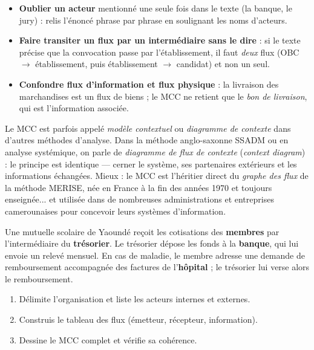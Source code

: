 \documentclass[11pt]{article}
\begin{document}
\begin{attention}
\begin{itemize}
\item \textbf{Oublier un acteur} mentionné une seule fois dans le texte (la banque, le jury) : relis l'énoncé phrase par phrase en soulignant les noms d'acteurs.
\item \textbf{Faire transiter un flux par un intermédiaire sans le dire} : si le texte précise que la convocation passe par l'établissement, il faut \emph{deux} flux (OBC $\rightarrow$ établissement, puis établissement $\rightarrow$ candidat) et non un seul.
\item \textbf{Confondre flux d'information et flux physique} : la livraison des marchandises est un flux de biens ; le MCC ne retient que le \emph{bon de livraison}, qui est l'information associée.
\end{itemize}
\end{attention}

\begin{savaistu}
Le MCC est parfois appelé \emph{modèle contextuel} ou \emph{diagramme de contexte} dans d'autres méthodes d'analyse. Dans la méthode anglo-saxonne SSADM ou en analyse systémique, on parle de \emph{diagramme de flux de contexte} (\emph{context diagram}) : le principe est identique — cerner le système, ses partenaires extérieurs et les informations échangées. Mieux : le MCC est l'héritier direct du \emph{graphe des flux} de la méthode MERISE, née en France à la fin des années 1970 et toujours enseignée... et utilisée dans de nombreuses administrations et entreprises camerounaises pour concevoir leurs systèmes d'information.
\end{savaistu}

\begin{exercice}
Une mutuelle scolaire de Yaoundé reçoit les cotisations des \textbf{membres} par l'intermédiaire du \textbf{trésorier}. Le trésorier dépose les fonds à la \textbf{banque}, qui lui envoie un relevé mensuel. En cas de maladie, le membre adresse une demande de remboursement accompagnée des factures de l'\textbf{hôpital} ; le trésorier lui verse alors le remboursement.
\begin{enumerate}
\item Délimite l'organisation et liste les acteurs internes et externes.
\item Construis le tableau des flux (émetteur, récepteur, information).
\item Dessine le MCC complet et vérifie sa cohérence.
\end{enumerate}
\end{exercice}
\end{document}
